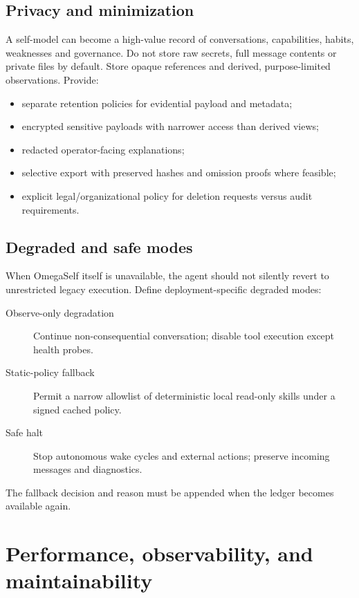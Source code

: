 \documentclass[11pt,oneside]{report}
\begin{document}
\section{Privacy and minimization}

A self-model can become a high-value record of conversations, capabilities, habits, weaknesses and governance. Do not store raw secrets, full message contents or private files by default. Store opaque references and derived, purpose-limited observations. Provide:

\begin{itemize}
  \item separate retention policies for evidential payload and metadata;
  \item encrypted sensitive payloads with narrower access than derived views;
  \item redacted operator-facing explanations;
  \item selective export with preserved hashes and omission proofs where feasible;
  \item explicit legal/organizational policy for deletion requests versus audit requirements.
\end{itemize}

\section{Degraded and safe modes}

When OmegaSelf itself is unavailable, the agent should not silently revert to unrestricted legacy execution. Define deployment-specific degraded modes:

\begin{description}
  \item[Observe-only degradation] Continue non-consequential conversation; disable tool execution except health probes.
  \item[Static-policy fallback] Permit a narrow allowlist of deterministic local read-only skills under a signed cached policy.
  \item[Safe halt] Stop autonomous wake cycles and external actions; preserve incoming messages and diagnostics.
\end{description}

The fallback decision and reason must be appended when the ledger becomes available again.

\chapter{Performance, observability, and maintainability}
\end{document}
